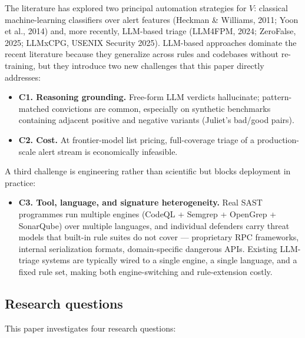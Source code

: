 \documentclass[11pt,a4paper]{article}
\begin{document}
The literature has explored two principal automation strategies for
$V$: classical machine-learning classifiers over alert features
(Heckman \& Williams, 2011; Yoon et al., 2014) and, more recently,
LLM-based triage (LLM4FPM, 2024; ZeroFalse, 2025; LLMxCPG,
USENIX Security 2025). LLM-based approaches dominate the recent
literature because they generalize across rules and codebases without
re-training, but they introduce two new challenges that this paper
directly addresses:

\begin{itemize}[leftmargin=*]
\item \textbf{C1. Reasoning grounding.} Free-form LLM verdicts
  hallucinate; pattern-matched convictions are common, especially on
  synthetic benchmarks containing adjacent positive and negative
  variants (Juliet's bad/good pairs).
\item \textbf{C2. Cost.} At frontier-model list pricing, full-coverage
  triage of a production-scale alert stream is economically infeasible.
\end{itemize}

A third challenge is engineering rather than scientific but blocks
deployment in practice:

\begin{itemize}[leftmargin=*]
\item \textbf{C3. Tool, language, and signature heterogeneity.} Real
  SAST programmes run multiple engines (CodeQL + Semgrep + OpenGrep +
  SonarQube) over multiple languages, and individual defenders carry
  threat models that built-in rule suites do not cover --- proprietary
  RPC frameworks, internal serialization formats, domain-specific
  dangerous APIs. Existing LLM-triage systems are typically wired to a
  single engine, a single language, and a fixed rule set, making both
  engine-switching and rule-extension costly.
\end{itemize}

\subsection{Research questions}

This paper investigates four research questions:
\end{document}
